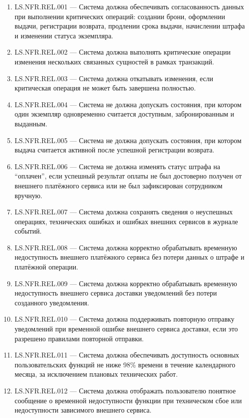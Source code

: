 \documentclass[12pt,a4paper]{article}
\begin{document}
	\begin{enumerate}
		\item LS.NFR.REL.001 --- Система должна обеспечивать согласованность данных
		при выполнении критических операций: создании брони, оформлении выдачи,
		регистрации возврата, продлении срока выдачи, начислении штрафа и изменении
		статуса экземпляра.
		
		\item LS.NFR.REL.002 --- Система должна выполнять критические операции изменения
		нескольких связанных сущностей в рамках транзакций.
		
		\item LS.NFR.REL.003 --- Система должна откатывать изменения, если критическая
		операция не может быть завершена полностью.
		
		\item LS.NFR.REL.004 --- Система не должна допускать состояния, при котором один
		экземпляр одновременно считается доступным, забронированным и выданным.
		
		\item LS.NFR.REL.005 --- Система не должна допускать состояния, при котором
		выдача считается активной после успешной регистрации возврата.
		
		\item LS.NFR.REL.006 --- Система не должна изменять статус штрафа на ``оплачен'',
		если успешный результат оплаты не был достоверно получен от внешнего платёжного
		сервиса или не был зафиксирован сотрудником вручную.
		
		\item LS.NFR.REL.007 --- Система должна сохранять сведения о неуспешных операциях,
		технических ошибках и ошибках внешних сервисов в журнале событий.
		
		\item LS.NFR.REL.008 --- Система должна корректно обрабатывать временную
		недоступность внешнего платёжного сервиса без потери данных о штрафе
		и платёжной операции.
		
		\item LS.NFR.REL.009 --- Система должна корректно обрабатывать временную
		недоступность внешнего сервиса доставки уведомлений без потери созданного
		уведомления.
		
		\item LS.NFR.REL.010 --- Система должна поддерживать повторную отправку
		уведомлений при временной ошибке внешнего сервиса доставки, если это разрешено
		правилами повторной отправки.
		
		\item LS.NFR.REL.011 --- Система должна обеспечивать доступность основных
		пользовательских функций не ниже 98\% времени в течение календарного месяца,
		за исключением плановых технических работ.
		
		\item LS.NFR.REL.012 --- Система должна отображать пользователю понятное сообщение
		о временной недоступности функции при техническом сбое или недоступности
		зависимого внешнего сервиса.
	\end{enumerate}
	
\end{document}
